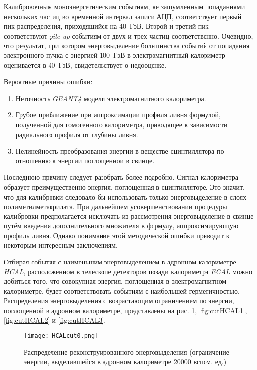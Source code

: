 Калибровочным моноэнергетическим событиям, не зашумленным попаданиями нескольких частиц во временной интервал записи АЦП, соответствует первый пик распределения, приходящийся на \mbox{40 ГэВ}. Второй и третий пик соответствуют \textit{pile-up} событиям от двух и трех частиц соответственно. Очевидно, что результат, при котором энерговыделение большинства событий от попадания электронного пучка с энергией \mbox{100 ГэВ} в электромагнитный калориметр оценивается в \mbox{40 ГэВ}, свидетельствует о недооценке.

Вероятные причины ошибки:
\begin{enumerate}[wide]
\item Неточность \textit{GEANT4} модели электромагнитного калориметра. 
\item Грубое приближение при аппроксимации профиля ливня формулой, полученной для гомогенного калориметра, приводящее к зависимости радиального профиля от глубины ливня.
\item Нелинейность преобразования энергии в веществе сцинтиллятора по отношению к энергии поглощённой в свинце.
\end{enumerate}

Последнюю причину следует разобрать более подробно. Сигнал калориметра образует преимущественно энергия, поглощенная в сцинтилляторе. Это значит, что для калибровки следовало бы использовать только энерговыделение в слоях полиметилметакрилата. При дальнейшем усовершенствовании процедуры калибровки предполагается исключать из рассмотрения энерговыделение в свинце путём введения дополнительного множителя в формулу, аппроксимирующую профиль ливня. Однако понимание этой методической ошибки приводит к некоторым интересным заключениям.

Отбирая события с наименьшим энерговыделением в адронном калориметре \textit{HCAL}, расположенном в телескопе детекторов позади калориметра \textit{ECAL} можно добиться того, что совокупная энергия, поглощенная в электромагнитном калориметре, будет соответствовать событиям с наибольшей герметичностью. Распределения энерговыделения с возрастающим ограничением по энергии, поглощенной в адронном калориметре, представлены на рис. \ref{fig:cutHCAL0}, \ref{fig:cutHCAL1}, \ref{fig:cutHCAL2} и \ref{fig:cutHCAL3}.

\begin{figure}[H]
    \centering
    \texttt{[image: HCALcut0.png]}
    \caption{Распределение реконструированного энерговыделения (ограничение энергии, выделившейся в адронном калориметре 20000 вспом. ед.)}
    \label{fig:cutHCAL0}
\end{figure}

